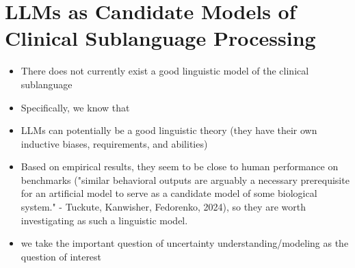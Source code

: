 

 
\section{LLMs as Candidate Models of Clinical Sublanguage Processing}
\begin{itemize}
    \item There does not currently exist a good linguistic model of the clinical sublanguage
    \item Specifically, we know that 
    \item LLMs can potentially be a good linguistic theory (they have their own inductive biases, requirements, and abilities)
    \item Based on empirical results, they seem to be close to human performance on benchmarks ("similar behavioral outputs are arguably a necessary prerequisite for an artificial model to serve as a candidate model of some biological system." - Tuckute, Kanwisher, Fedorenko, 2024), so they are worth investigating as such a linguistic model.
    \item we take the important question of uncertainty understanding/modeling as the question of interest
\end{itemize}


